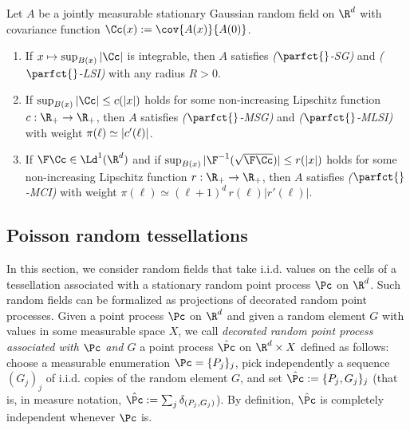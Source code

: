 \begin{theo}\label{cor:gaussiansg}
Let $A$ be a jointly measurable stationary Gaussian random field on $\R^d$ with covariance function $\Cc(x):=\cov{A(x)}{A(0)}$.
\begin{enumerate}\romanenumi
\item \label{theo3.1.1}If $x\mapsto \sup_{B(x)}|\Cc|$ is integrable, then $A$ satisfies \emph{($\parfct{}$-SG)} and \emph{($\parfct{}$-LSI)} with any radius $R>0$.
\item \label{theo3.1.2}If $\sup_{B(x)}|\Cc| \le c(|x|)$ holds for some non-increasing Lipschitz function\linebreak$c:\R_+\to\R_+$, then $A$ satisfies \emph{($\parfct{}$-MSG)} and \emph{($\parfct{}$-MLSI)} with weight $\pi(\ell)\linebreak\simeq |c'(\ell)|$.
\item \label{theo3.1.3}If $\F\Cc\in\Ld^1(\R^d)$ and if $\sup_{B(x)}|\F^{-1}(\sqrt{\F\Cc})|\le r(|x|)$ holds for some non-increasing Lipschitz function $r:\R_+\to\R_+$, then $A$ satisfies \emph{($\parfct{}$-MCI)} with weight $\pi(\ell)\simeq (\ell+1)^d\,r(\ell)|r'(\ell)|$.
\qedhere
\end{enumerate}
\end{theo}

\subsection{Poisson random tessellations}\label{chap:tessel}
In this section, we consider random fields that take i.i.d. values on the cells of a tessellation associated with a stationary random point process $\Pc$ on $\R^d$. Such random fields can be formalized as projections of decorated random point processes. Given a point process $\Pc$ on $\R^d$ and given a random element $G$ with values in some measurable space $X$, we call \emph{decorated random point process associated with $\Pc$ and $G$} a point process $\hat\Pc$ on $\R^d\times X$ defined as follows: choose a measurable enumeration $\Pc=\{P_j\}_j$, pick independently a sequence $(G_j)_j$ of i.i.d. copies of the random element $G$, and set $\hat\Pc:=\{P_j,G_j\}_j$ (that is, in measure notation, $\hat\Pc:=\sum_j\delta_{(P_j,G_j)}$). By definition, $\hat\Pc$ is completely independent whenever $\Pc$ is.



